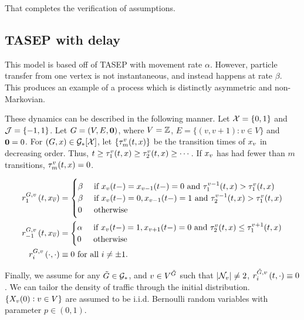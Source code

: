That completes the verification of assumptions.

\subsection{TASEP with delay}
\label{ex::tasep}

This model is based off of TASEP with movement rate \(\alpha\). However, particle transfer from one vertex is not instantaneous, and instead happens at rate \(\beta\). This produces an example of a process which is distinctly asymmetric and non-Markovian.

\ind These dynamics can be described in the following manner. Let \(\mathcal{X} = \{0,1\}\) and \(\mathcal{J} = \{-1,1\}\). Let \(G = (V,E,\mathbf{0})\), where \(V = \mathbb{Z}\), \(E = \{(v,v+1): v \in V\}\) and \(\mathbf{0} = 0\). For \((G,x)\in \mathcal{G}_\ast[\mathcal{X}]\), let \(\{\tau^v_m(t,x)\}\) be the transition times of \(x_{v}\) in decreasing order. Thus, \(t \geq \tau^v_1(t,x) \geq \tau^v_2(t,x) \geq\cdots\). If \(x_{v}\) has had fewer than \(m\) transitions, \(\tau^v_m(t,x) = 0\).

\begin{align*}
\rate\gvpara{G}{v}\stpara{1}\tmepro{t}{\xf_{\cl{v}}}{} &=  \begin{cases}
\beta &\te{ if } \xf\vind{v}\tme{t-} = \xf\vind{v-1}\tme{t-} = 0\te{ and } \tau^{v-1}_1(t,\xf) > \tau^v_1(t,\xf)\\
\beta &\te{ if } \xf\vind{v}\tme{t-} = 0,\xf\vind{v-1}\tme{t-} = 1\te{ and } \tau^{v-1}_2(t,\xf) > \tau^v_1(t,\xf)\\
0&\te{ otherwise}
\end{cases}\\
\rate\gvpara{G}{v}\stpara{-1}\tmepro{t}{\xf_{\cl{v}}}{} &=  \begin{cases}
\alpha &\te{ if } \xf\vind{v}\tme{t-} = 1, \xf\vind{v+1}\tme{t-} = 0\te{ and } \tau^{v}_2(t,\xf) \leq \tau^{v+1}_1(t,\xf)\\
0&\te{ otherwise}
\end{cases}\\
\rate\gvpara{G}{v}\stpara{i}\tmepro{\cdot}{\cdot}{} &\equiv 0\te{ for all } i \neq \pm 1.
\end{align*}

Finally, we assume for any \(\tilde{G} \in \mathcal{G}_\ast\), and \(v \in V^{\tilde{G}}\) such that \(|\mathcal{N}_{v}| \neq 2\), \(\rate\gvpara{\tilde{G}}{v}\stpara{i}\tmepro{t}{\cdot}{} \equiv 0\). We can tailor the density of traffic through the initial distribution. \(\{X_{v}(0):v \in V\}\) are assumed to be i.i.d. Bernoulli random variables with parameter \(p \in (0,1)\).

